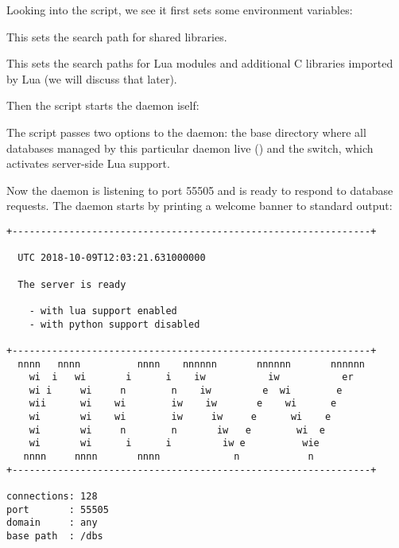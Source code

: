 Looking into the script,
we see it first sets some environment variables:


This sets the search path for shared libraries.



This sets the search paths for Lua modules
and additional C libraries imported by Lua
(we will discuss that later).

Then the script starts the daemon iself:


The script passes two options to the daemon:
the base directory where all databases
managed by this particular daemon live ()
and the  switch, which activates
server-side Lua support.

Now the daemon is listening to port 55505
and is ready to respond to database requests.
The daemon starts by printing a welcome banner
to standard output:

\begingroup
\small
\begin{minipage}{\textwidth}
\begin{verbatim}
+---------------------------------------------------------------+ 
 
  UTC 2018-10-09T12:03:21.631000000
 
  The server is ready
 
    - with lua support enabled
    - with python support disabled
 
+---------------------------------------------------------------+ 
  nnnn   nnnn          nnnn    nnnnnn       nnnnnn       nnnnnn  
    wi  i   wi       i      i    iw           iw           er   
    wi i     wi     n        n    iw         e  wi        e    
    wii      wi    wi        iw    iw       e    wi      e        
    wi       wi    wi        iw     iw     e      wi    e        
    wi       wi     n        n       iw   e        wi  e        
    wi       wi      i      i         iw e          wie          
   nnnn     nnnn       nnnn             n            n            
+---------------------------------------------------------------+ 

connections: 128
port       : 55505
domain     : any
base path  : /dbs
\end{verbatim}
\end{minipage}
\endgroup


